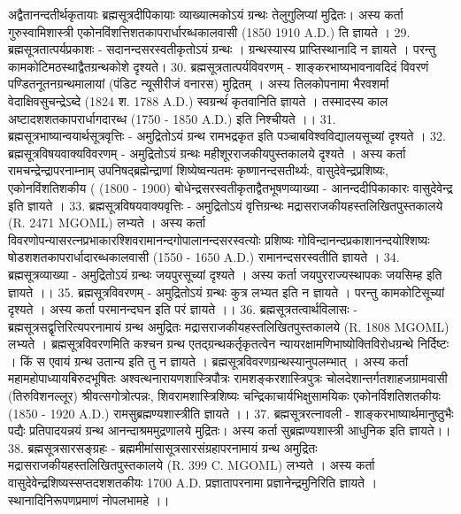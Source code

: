 अद्वैतानन्दतीर्थकृतायाः ब्रह्मसूत्रदीपिकायाः व्याख्यात्मकोऽयं ग्रन्थः तेलुगुलिप्यां मुद्रितः। अस्य कर्ता गुरुस्वामिशास्त्री एकोनविंशत्तिशतकापरार्धारब्धकालवासी (1850 1910 A.D.) ति ज्ञायते । 
29. ब्रह्मसूत्रतात्पर्यप्रकाशः - 
सदानन्दसरस्वतीकृतोऽयं ग्रन्थः । ग्रन्थस्यास्य प्राप्तिस्थानादि न ज्ञायते । परन्तु कामकोटिमठस्थाद्वैतग्रन्थकोशे दृश्यते। 
30. ब्रह्मसूत्रतात्पर्यविवरणम् - 
शाङ्करभाष्यभावनावदिदं विवरणं पण्डितनूतनग्रन्थमालायां (पंडिट न्यूसीरीजं वनारस) मुद्रितम् । अस्य तिलकोपनामा भैरवशर्मा वेदाक्षिवसुचन्द्रेऽब्दे (1824 श. 1788 A.D.) स्वग्रन्थंं कृतवानिति ज्ञायते । तस्मादस्य काल अष्टादशशतकापरार्धागदारब्ध (1750 - 1850 A.D.) इति निश्चीयते ।। 
31. ब्रह्मसूत्रभाष्यान्वयार्थसूत्रवृत्तिः - 
अमुद्रितोऽयं ग्रन्थ रामभद्रकृत इति पञ्चाबविश्वविद्यालयसूच्यां दृश्यते । 
32. ब्रह्मसूत्रविषयवाक्यविवरणम् -
अमुद्रितोऽयं ग्रन्थः महीशूरराजकीयपुस्तकालये दृश्यते । अस्य कर्ता रामचन्द्रेन्द्रापरनाम्नाम् उपनिषद्ब्रह्मेन्द्राणां शिष्येष्वन्यतमः कृष्णानन्दसतीर्थ्यः, वासुदेवेन्द्रप्रशिष्यः, एकोनविंशतिशकीय ( (1800 - 1900) बोधेन्द्रसरस्वतीकृताद्वैतभूषणव्याख्या - आनन्ददीपिकाकारः वासुदेवेन्द्र इति ज्ञायते । 
33. ब्रह्मसूत्रविषयवाक्यवृत्तिः -
अमुद्रितोऽयं वृत्तिग्रन्थः मद्रासराजकीयहस्तलिखितपुस्तकालये (R. 2471 MGOML) लभ्यते । अस्य कर्ता विवरणोपन्यासरत्नप्रभाकारश्शिवरामानन्दगोपालानन्दसरस्वत्योः प्रशिष्यः गोविन्दानन्दप्रकाशानन्दयोश्शिष्यः षोडशशतकापरार्धादारब्धकालवासी (1550 - 1650 A.D.) रामानन्दसरस्वतीति ज्ञायते । 
34. ब्रह्मसूत्रव्याख्या -
अमुद्रितोऽयं ग्रन्थः जयपुरसूच्यां दृश्यते । अस्य कर्ता जयपुरराज्यस्थापकः जयसिम्ह इति ज्ञायते ।। 
35. ब्रह्मसूत्रविवरणम् - 
अमुद्रितोऽयं ग्रन्थः कुत्र लभ्यत इति न ज्ञायते । परन्तु कामकोटिसूच्यां दृश्यते । अस्य कर्ता परमानन्दघन इति परं ज्ञायते ।।
36. ब्रह्मसूत्रतत्वार्थविलासः -
ब्रह्मसूत्रसद्वृत्तिरित्यपरनामायं ग्रन्थ अमुद्रितः मद्रासराजकीयहस्तलिखितपुस्तकालये (R. 1808 MGOML) लभ्यते । ब्रह्मसूत्रविवरणमिति कश्चन ग्रन्थ एतद्ग्रन्थकर्तृकृतत्वेन न्यायरक्षामणिभाष्योक्तिविरोधग्रन्थे निर्दिष्टः । किं स एवायं ग्रन्थ उतान्य इति तु न ज्ञायते । ब्रह्मसूत्रविवरणग्रन्थस्यानुपलम्भात् । अस्य कर्ता महामहोपाध्यायबिरुदभूषितः अश्वत्थनारायणशास्त्रिपौत्रः रामशङ्करशास्त्रिपुत्रः चोलदेशान्तर्गतशाहजग्रामवासी (तिरुविशनल्लूर) श्रीवत्सगोत्रोत्पन्नः, शिवरामशास्त्रिशिष्यः चन्द्रिकाचार्यभिक्षुसामयिकः एकोनर्विशतिशतकीयः (1850 - 1920 A.D.) रामसुब्रह्मण्यशास्त्रीति ज्ञायते ।। 
37. ब्रह्मसूत्ररत्नावली -
शाङ्करभाष्यार्थमानुष्ठुभैः पद्यैः प्रतिपादयन्नयं ग्रन्थ आनन्दाश्रममुद्रणालये मुद्रितः। अस्य कर्ता सुब्रह्मण्यशास्त्री आधुनिक इति ज्ञायते।।
38. ब्रह्मसूत्रसारसङ्ग्रहः -
ब्रह्ममीमांसासूत्रसारसंग्रहापरनामायं ग्रन्थ अमुद्रितः मद्रासराजकीयहस्तलिखितपुस्तकालये (R. 399 C. MGOML) लभ्यते । अस्य कर्ता वासुदेवेन्द्रशिष्यस्सप्तदशशतकीयः 1700 A.D. प्रज्ञातापरनामा प्रज्ञानेन्द्रमुनिरिति ज्ञायते । स्थानादिनिरूपणप्रमाणं नोपलभामहे ।। 
